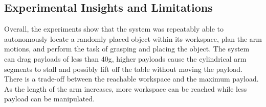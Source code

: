 \subsection{Experimental Insights and Limitations}
Overall, the experiments show that the system was repeatably able to autonomously locate a randomly placed object within its workspace, plan the arm motions, and perform the task of grasping and placing the object.
The system can drag payloads of less than 40\unit{g}, higher payloads cause the cylindrical arm segments to stall and possibly lift off the table without moving the payload.
There is a trade-off between the reachable workspace and the maximum payload.
As the length of the arm increases, more workspace can be reached while less payload can be manipulated. 

